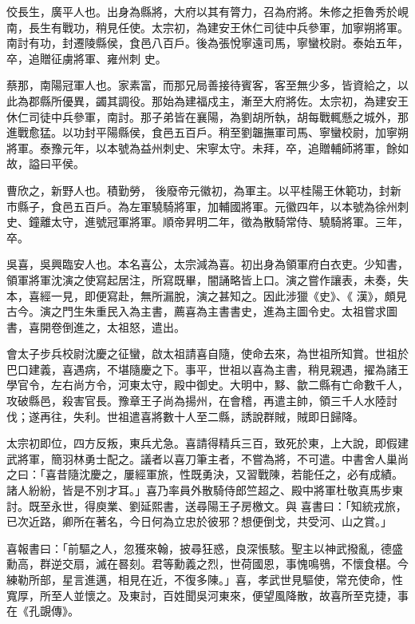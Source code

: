 \begin{pinyinscope}
 佼長生，廣平人也。出身為縣將，大府以其有膂力，召為府將。朱修之拒魯秀於峴南，長生有戰功，稍見任使。太宗初，為建安王休仁司徒中兵參軍，加寧朔將軍。南討有功，封遷陵縣侯，食邑八百戶。後為張悅寧遠司馬，寧蠻校尉。泰始五年，卒，追贈征虜將軍、雍州刺
 史。



 蔡那，南陽冠軍人也。家素富，而那兄局善接待賓客，客至無少多，皆資給之，以此為郡縣所優異，蠲其調役。那始為建福戍主，漸至大府將佐。太宗初，為建安王休仁司徒中兵參軍，南討。那子弟皆在襄陽，為劉胡所執，胡每戰輒懸之城外，那進戰愈猛。以功封平陽縣侯，食邑五百戶。稍至劉韞撫軍司馬、寧蠻校尉，加寧朔將軍。泰豫元年，以本號為益州刺史、宋寧太守。未拜，卒，追贈輔師將軍，餘如故，謚曰平侯。



 曹欣之，新野人也。積勤勞，
 後廢帝元徽初，為軍主。以平桂陽王休範功，封新市縣子，食邑五百戶。為左軍驍騎將軍，加輔國將軍。元徽四年，以本號為徐州刺史、鐘離太守，進號冠軍將軍。順帝昇明二年，徵為散騎常侍、驍騎將軍。三年，卒。



 吳喜，吳興臨安人也。本名喜公，太宗減為喜。初出身為領軍府白衣吏。少知書，領軍將軍沈演之使寫起居注，所寫既畢，闇誦略皆上口。演之嘗作讓表，未奏，失本，喜經一見，即便寫赴，無所漏脫，演之甚知之。因此涉獵《史》、《
 漢》，頗見古今。演之門生朱重民入為主書，薦喜為主書書史，進為主圖令史。太祖嘗求圖書，喜開卷倒進之，太祖怒，遣出。



 會太子步兵校尉沈慶之征蠻，啟太祖請喜自隨，使命去來，為世祖所知賞。世祖於巴口建義，喜遇病，不堪隨慶之下。事平，世祖以喜為主書，稍見親遇，擢為諸王學官令，左右尚方令，河東太守，殿中御史。大明中，黟、歙二縣有亡命數千人，攻破縣邑，殺害官長。豫章王子尚為揚州，在會稽，再遣主帥，領三千人水陸討
 伐；遂再往，失利。世祖遣喜將數十人至二縣，誘說群賊，賊即日歸降。



 太宗初即位，四方反叛，東兵尤急。喜請得精兵三百，致死於東，上大說，即假建武將軍，簡羽林勇士配之。議者以喜刀筆主者，不嘗為將，不可遣。中書舍人巢尚之曰：「喜昔隨沈慶之，屢經軍旅，性既勇決，又習戰陳，若能任之，必有成績。諸人紛紛，皆是不別才耳。」喜乃率員外散騎侍郎竺超之、殿中將軍杜敬真馬步東討。既至永世，得庾業、劉延熙書，送尋陽王子房檄文。與
 喜書曰：「知統戎旅，已次近路，卿所在著名，今日何為立忠於彼邪？想便倒戈，共受河、山之賞。」



 喜報書曰：「前驅之人，忽獲來翰，披尋狂惑，良深悵駭。聖主以神武撥亂，德盛勳高，群逆交扇，滅在晷刻。君等勳義之烈，世荷國恩，事愧鳴鴞，不懷食椹。今練勒所部，星言進邁，相見在近，不復多陳。」喜，孝武世見驅使，常充使命，性寬厚，所至人並懷之。及東討，百姓聞吳河東來，便望風降散，故喜所至克捷，事在《孔覬傳》。




\end{pinyinscope}
